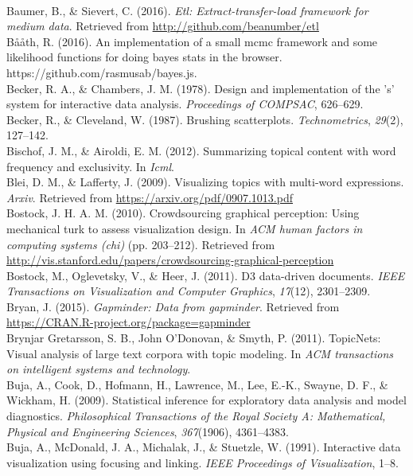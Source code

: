\documentclass[12pt,]{isuthesis}
\begin{document}
\\
\hypertarget{ref-etl}{} 
Baumer, B., \& Sievert, C. (2016). \emph{Etl: Extract-transfer-load framework for medium data}. Retrieved from \url{http://github.com/beanumber/etl}
\\
\hypertarget{ref-bayes-js}{}
Bååth, R. (2016). An implementation of a small mcmc framework and some
likelihood functions for doing bayes stats in the browser.
https://github.com/rasmusab/bayes.js.
\\
\hypertarget{ref-S:1978}{}
Becker, R. A., \& Chambers, J. M. (1978). Design and implementation of
the 's' system for interactive data analysis. \emph{Proceedings of
COMPSAC}, 626--629.
\\
\hypertarget{ref-brushing-scatterplots}{}
Becker, R., \& Cleveland, W. (1987). Brushing scatterplots.
\emph{Technometrics}, \emph{29}(2), 127--142.
\\
\hypertarget{ref-Bischof}{}
Bischof, J. M., \& Airoldi, E. M. (2012). Summarizing topical content
with word frequency and exclusivity. In \emph{Icml}.
\\
\hypertarget{ref-Blei-2009}{}
Blei, D. M., \& Lafferty, J. (2009). Visualizing topics with multi-word
expressions. \emph{Arxiv}. Retrieved from
\url{https://arxiv.org/pdf/0907.1013.pdf}
\\
\hypertarget{ref-crowdsourcing-graphical-perception}{}
Bostock, J. H. A. M. (2010). Crowdsourcing graphical perception: Using
mechanical turk to assess visualization design. In \emph{ACM human
factors in computing systems (chi)} (pp. 203--212). Retrieved from
\url{http://vis.stanford.edu/papers/crowdsourcing-graphical-perception}
\\
\hypertarget{ref-d3}{}
Bostock, M., Oglevetsky, V., \& Heer, J. (2011). D3 data-driven
documents. \emph{IEEE Transactions on Visualization and Computer
Graphics}, \emph{17}(12), 2301--2309.
\\
\hypertarget{ref-gapminder}{}
Bryan, J. (2015). \emph{Gapminder: Data from gapminder}. Retrieved from
\url{https://CRAN.R-project.org/package=gapminder}
\\
\hypertarget{ref-Gretarsson}{}
Brynjar Gretarsson, S. B., John O'Donovan, \& Smyth, P. (2011).
TopicNets: Visual analysis of large text corpora with topic modeling. In
\emph{ACM transactions on intelligent systems and technology}.
\\
\hypertarget{ref-Buja:2009hp}{}
Buja, A., Cook, D., Hofmann, H., Lawrence, M., Lee, E.-K., Swayne, D.
F., \& Wickham, H. (2009). Statistical inference for exploratory data
analysis and model diagnostics. \emph{Philosophical Transactions of the
Royal Society A: Mathematical, Physical and Engineering Sciences},
\emph{367}(1906), 4361--4383.
\\
\hypertarget{ref-Buja:1991vh}{}
Buja, A., McDonald, J. A., Michalak, J., \& Stuetzle, W. (1991).
Interactive data visualization using focusing and linking. \emph{IEEE
Proceedings of Visualization}, 1--8.
\end{document}
